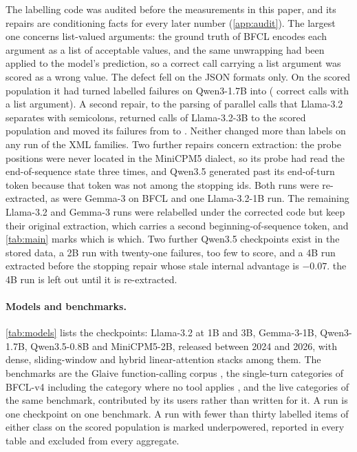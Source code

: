 The labelling code was audited before the measurements in this paper, and its repairs are conditioning facts for every later number (\cref{app:audit}). The largest one concerns list-valued arguments: the ground truth of BFCL encodes each argument as a list of acceptable values, and the same unwrapping had been applied to the model's prediction, so a correct call carrying a list argument was scored as a wrong value. The defect fell on the JSON formats only. On the scored population it had turned \repPosBeforeQwenThreeBfcl{} labelled failures on Qwen3-1.7B into \repPosAfterQwenThreeBfcl{} (\repListFlipsQwenThreeBfcl{} correct calls with a list argument). A second repair, to the parsing of parallel calls that Llama-3.2 separates with semicolons, returned \repParallelLlamaThreeBBfcl{} calls of Llama-3.2-3B to the scored population and moved its failures from \repPosBeforeLlamaThreeBBfcl{} to \repPosAfterLlamaThreeBBfcl{}. Neither changed more than  labels on any run of the XML families. Two further repairs concern extraction: the probe positions were never located in the MiniCPM5 dialect, so its probe had read the end-of-sequence state three times, and Qwen3.5 generated past its end-of-turn token because that token was not among the stopping ids. Both runs were re-extracted, as were Gemma-3 on BFCL and one Llama-3.2-1B run. The remaining Llama-3.2 and Gemma-3 runs were relabelled under the corrected code but keep their original extraction, which carries a second beginning-of-sequence token, and \cref{tab:main} marks which is which. Two further Qwen3.5 checkpoints exist in the stored data, a 2B run with twenty-one failures, too few to score, and a 4B run extracted before the stopping repair whose stale internal advantage is $-0.07$. the 4B run is left out until it is re-extracted.

\paragraph{Models and benchmarks.}
\cref{tab:models} lists the checkpoints: Llama-3.2 at 1B and 3B, Gemma-3-1B, Qwen3-1.7B, Qwen3.5-0.8B and MiniCPM5-2B, released between 2024 and 2026, with dense, sliding-window and hybrid linear-attention stacks among them. The benchmarks are the Glaive function-calling corpus \citep{glaive2024}, the single-turn categories of BFCL-v4 including the category where no tool applies \citep{patil2025bfcl}, and the live categories of the same benchmark, contributed by its users rather than written for it. A run is one checkpoint on one benchmark. A run with fewer than thirty labelled items of either class on the scored population is marked underpowered, reported in every table and excluded from every aggregate.


